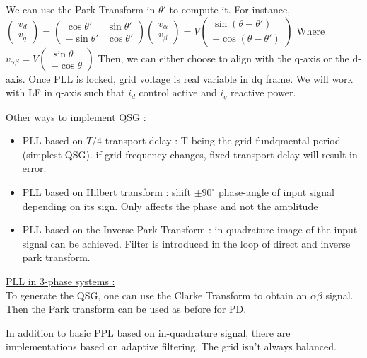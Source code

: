 \documentclass[../main.tex]{subfiles}
\begin{document}
\warning We can use the Park Transform in $\theta'$ to compute it. For instance, $\begin{pmatrix}
    v_d\\ v_q 
\end{pmatrix} = \begin{pmatrix}
    \cos \theta' & \sin \theta'\\
    - \sin \theta' & \cos \theta'
\end{pmatrix}  \begin{pmatrix}
    v_{\alpha}\\ v_{\beta}
\end{pmatrix} = V \begin{pmatrix}
    \sin ( \theta - \theta')\\
    -\cos( \theta - \theta')
\end{pmatrix}$
Where $v_{\alpha \beta} = V \begin{pmatrix}
    \sin \theta\\ -\cos \theta
\end{pmatrix}$
Then, we can either choose to align with the q-axis or the d-axis. Once PLL is locked, grid voltage is real variable in dq frame. We will work with LF in q-axis such that $i_d$ control active and $i_q$ reactive power.

Other ways to implement QSG : \begin{itemize}
    \item PLL based on $T/4$ transport delay : T being the grid fundqmental period (simplest QSG). if grid frequency changes, fixed transport delay will result in error.
    \item PLL based on Hilbert transform : shift $\pm 90^\circ $ phase-angle of input signal depending on its sign. Only affects the phase and not the amplitude
    \item PLL based on the Inverse Park Transform : in-quadrature image of the input signal can be achieved. Filter is introduced in the loop of direct and inverse park transform.
\end{itemize}

\quad \underline{PLL in 3-phase systems :}\\
To generate the QSG, one can use the Clarke Transform to obtain an $\alpha\beta$ signal. Then the Park transform can be used as before for PD.

In addition to basic PPL based on in-quadrature signal, there are implementations based on adaptive filtering. The grid isn't always balanced.\\
\end{document}
